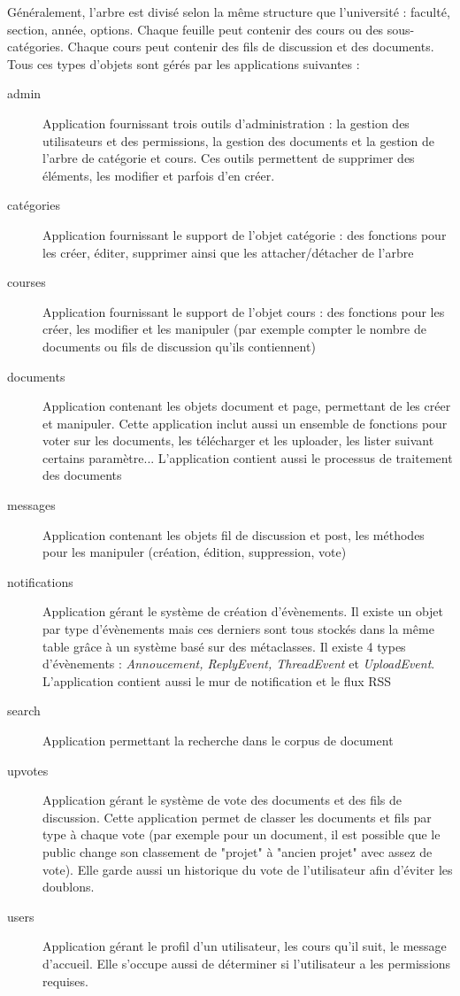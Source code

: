 \documentclass[a4paper,12pt]{article}
\begin{document}
Généralement, l'arbre est divisé selon la même structure que l'université : faculté,
section, année, options. Chaque feuille peut contenir des cours ou des sous-catégories.
Chaque cours peut contenir des fils de discussion et des documents. Tous ces
types d'objets sont gérés par les applications suivantes :

\begin{description}
\item[admin] Application fournissant trois outils d'administration : la gestion
   des utilisateurs et des permissions, la gestion des documents et la gestion
   de l'arbre de catégorie et cours. Ces outils permettent de supprimer des éléments,
   les modifier et parfois d'en créer.
\item[catégories] Application fournissant le support de l'objet catégorie :
   des fonctions pour les créer, éditer, supprimer ainsi que les attacher/détacher de l'arbre
\item[courses] Application fournissant le support de l'objet cours :
   des fonctions pour les créer, les modifier et les manipuler (par exemple compter le nombre
   de documents ou fils de discussion qu'ils contiennent)
\item[documents] Application contenant les objets document et page, permettant de les
   créer et manipuler. Cette application inclut aussi un ensemble de fonctions pour
   voter sur les documents, les télécharger et les uploader, les lister suivant certains
   paramètre... L'application contient aussi le processus de traitement des documents
\item[messages] Application contenant les objets fil de discussion et post, les méthodes
   pour les manipuler (création, édition, suppression, vote)
\item[notifications] Application gérant le système de création d'évènements. Il existe
   un objet par type d'évènements mais ces derniers sont tous stockés dans la même
   table grâce à un système basé sur des métaclasses. Il existe 4 types d'évènements :
   \textit{Annoucement, ReplyEvent, ThreadEvent} et \textit{UploadEvent}. L'application
   contient aussi le mur de notification et le flux RSS
\item[search] Application permettant la recherche dans le corpus de document
\item[upvotes] Application gérant le système de vote des documents et des fils de discussion.
   Cette application permet de classer les documents et fils par type à chaque vote
   (par exemple pour un document, il est possible que le public change son classement
   de "projet" à "ancien projet" avec assez de vote). Elle garde aussi un historique
   du vote de l'utilisateur afin d'éviter les doublons.
\item[users] Application gérant le profil d'un utilisateur, les cours qu'il suit, le
   message d'accueil. Elle s'occupe aussi de déterminer si l'utilisateur a les permissions requises.
\end{description}
\end{document}
